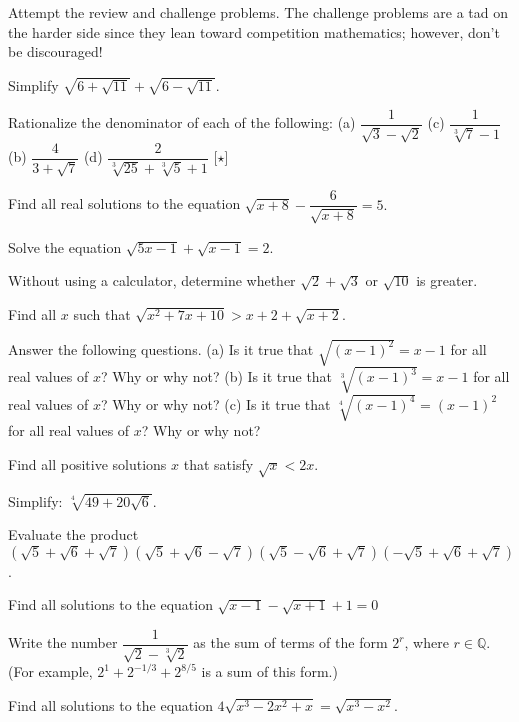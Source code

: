 \documentclass[lang=en,11pt]{elegantbook}
\begin{document}
Attempt the review and challenge problems.  The challenge problems are a tad on the harder side since they lean toward competition mathematics; however, don't be discouraged!
\begin{reviewset}
\item Simplify $\sqrt{6+\sqrt{11}}+\sqrt{6-\sqrt{11}}$. \vspace{3mm}
\item Rationalize the denominator of each of the following: \newline 
(a) $\dfrac{1}{\sqrt{3}-\sqrt{2}}$ \hspace{40mm} (c) $\dfrac{1}{\sqrt[3]{7}-1}$ \newline
(b) $\dfrac{4}{3+\sqrt{7}}$ \hspace{43mm} (d) $\dfrac{2}{\sqrt[3]{25}+\sqrt[3]{5}+1}$ [$\star$]  \vspace{3mm}
\item Find all real solutions to the equation $\sqrt{x+8}-\dfrac{6}{\sqrt{x+8}}=5.$ \vspace{3mm}
\item Solve the equation $\sqrt{5x-1}+\sqrt{x-1}=2$. \vspace{3mm}
\item Without using a calculator, determine whether $\sqrt{2}+\sqrt{3}$ or $\sqrt{10}$ is greater. \vspace{3mm}
\item Find all $x$ such that $\sqrt{x^2+7x+10}>x+2+\sqrt{x+2}$. \vspace{3mm}
\item Answer the following questions. \newline 
(a) Is it true that $\sqrt{(x-1)^2}=x-1$ for all real values of $x$? Why or why not? \newline 
(b) Is it true that $\sqrt[3]{(x-1)^3}=x-1$ for all real values of $x$? Why or why not? \newline 
(c) Is it true that $\sqrt[4]{(x-1)^4}=(x-1)^2$ for all real values of $x$? Why or why not? \vspace{3mm}
\item Find all positive solutions $x$ that satisfy $\sqrt{x}<2x$. \vspace{3mm}
\item Simplify: $\sqrt[4]{49+20\sqrt{6}}$. \vspace{3mm}
\item Evaluate the product $\left(\sqrt{5}+\sqrt{6}+\sqrt{7}\right)\left(\sqrt{5}+\sqrt{6}-\sqrt{7}\right)\left(\sqrt{5}-\sqrt{6}+\sqrt{7}\right)\left(-\sqrt{5}+\sqrt{6}+\sqrt{7}\right)$. \vspace{3mm}
\item Find all solutions to the equation $\sqrt{x-1}-\sqrt{x+1}+1=0$ \vspace{3mm}
\item Write the number $\dfrac{1}{\sqrt{2}-\sqrt[3]{2}}$ as the sum of terms of the form $2^r$, where $r\in\mathbb{Q}$. (For example, $2^1+2^{-1/3}+2^{8/5}$ is a sum of this form.) \vspace{3mm}
\item Find all solutions to the equation $4\sqrt{x^3-2x^2+x}=\sqrt{x^3-x^2}$. \vspace{3mm}
\end{reviewset}
\end{document}
